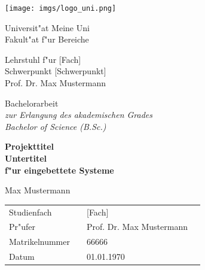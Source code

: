 \documentclass[11pt,a4paper,ngerman,oneside,notitlepage,abstracton]{scrreprt}
\begin{document}
\begin{titlepage}

\begin{center}
\normalsize
\texttt{[image: imgs/logo\_uni.png]}\\
\vspace{10mm}
\end{center}

\begin{center}
\Large
Universit"at Meine Uni\\
Fakult"at f"ur Bereiche\\
\end{center}

\vspace{5mm}

\begin{center}
\Large
Lehrstuhl f"ur [Fach]\\
\normalsize
Schwerpunkt [Schwerpunkt]\\
\Large
Prof. Dr. Max Mustermann
\end{center}

\normalsize\vspace{10mm}

\begin{center}
\Huge
Bachelorarbeit\\
\small
\textit{
zur Erlangung des akademischen Grades\\
Bachelor of Science (B.Sc.)\\
}
\end{center}

\normalsize\vspace{10mm}

\begin{center}
\textbf{
\Large
Projekttitel\\
\normalsize
Untertitel\\ f"ur eingebettete Systeme\\
}
\end{center}

\normalsize\vspace{10mm}

\begin{center}
\Large
Max Mustermann\\
\end{center}
\normalsize\vspace{10mm}

\begin{center}
\begin{tabular}{llll}
Studienfach & & [Fach] & \\
Pr"ufer & & Prof. Dr. Max Mustermann & \\
Matrikelnummer & & 66666 & \\
Datum & & 01.01.1970 & \\
\end{tabular}
\end{center}

\end{titlepage}
\end{document}

